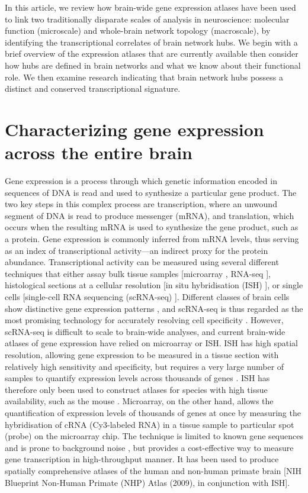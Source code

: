 In this article, we review how brain-wide gene expression atlases have been used to link two traditionally disparate scales of analysis in neuroscience: molecular function (microscale) and whole-brain network topology (macroscale), by identifying the transcriptional correlates of brain network hubs. We begin with a brief overview of the expression atlases that are currently available then consider how hubs are defined in brain networks and what we know about their functional role. We then examine research indicating that brain network hubs possess a distinct and conserved transcriptional signature.

\section{Characterizing gene expression across the entire brain}

Gene expression is a process through which genetic information encoded in sequences of DNA is read and used to synthesize a particular gene product. 
The two key steps in this complex process are transcription, where an unwound segment of DNA is read to produce messenger (mRNA), and translation, which occurs when the resulting mRNA is used to synthesize the gene product, such as a protein. Gene expression is commonly inferred from mRNA levels, thus serving as an index of transcriptional activity---an indirect proxy for the protein abundance. 
Transcriptional activity can be measured using several different techniques that either assay bulk tissue samples [microarray \citep{Schulze2001}, RNA-seq \citep{Mortazavi2008,Wang2009}], histological sections at a cellular resolution [in situ hybridisation (ISH) \citep{Schulze2001}], or single cells [single-cell RNA sequencing (scRNA-seq) \citep{Tang2009}]. 
Different classes of brain cells show distinctive gene expression patterns \citep{Darmanis2015,Tasic2016,Poulin2016,Mancarci2017}, and scRNA-seq is thus regarded as the most promising technology for accurately resolving cell specificity \citep{Yu2016}. 
However, scRNA-seq is difficult to scale to brain-wide analyses, and current brain-wide atlases of gene expression have relied on microarray or ISH. 
ISH has high spatial resolution, allowing gene expression to be measured in a tissue section with relatively high sensitivity and specificity, but requires a very large number of samples to quantify expression levels across thousands of genes \citep{Unger2010}. 
ISH has therefore only been used to construct atlases for species with high tissue availability, such as the mouse \citep{Lein2007a}. 
Microarray, on the other hand, allows the quantification of expression levels of thousands of genes at once by measuring the hybridisation of cRNA (Cy3-labeled RNA) in a tissue sample to particular spot (probe) on the microarray chip. 
The technique is limited to known gene sequences and is prone to background noise \citep{Okoniewski2006,Royce2007}, but provides a cost-effective way to measure gene transcription in high-throughput manner. It has been used to produce spatially comprehensive atlases of the human \citep{Kang2011,Hawrylycz2012,Miller2014} and non-human primate brain [NIH Blueprint Non-Human Primate (NHP) Atlas (2009), in conjunction with ISH].

